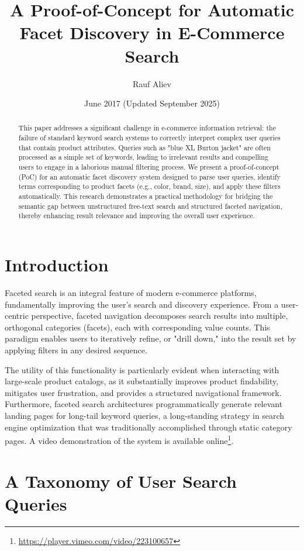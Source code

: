 \documentclass{article}
\title{\textbf{A Proof-of-Concept for Automatic Facet Discovery in E-Commerce Search}}
\author{Rauf Aliev}
\date{June 2017 (Updated September 2025)}
\begin{document}
    \maketitle

    \begin{abstract}
        This paper addresses a significant challenge in e-commerce information retrieval: the failure of standard keyword search systems to correctly interpret complex user queries that contain product attributes. Queries such as "blue XL Burton jacket" are often processed as a simple set of keywords, leading to irrelevant results and compelling users to engage in a laborious manual filtering process. We present a proof-of-concept (PoC) for an automatic facet discovery system designed to parse user queries, identify terms corresponding to product facets (e.g., color, brand, size), and apply these filters automatically. This research demonstrates a practical methodology for bridging the semantic gap between unstructured free-text search and structured faceted navigation, thereby enhancing result relevance and improving the overall user experience.
    \end{abstract}

    \section{Introduction}

    Faceted search is an integral feature of modern e-commerce platforms, fundamentally improving the user's search and discovery experience. From a user-centric perspective, faceted navigation decomposes search results into multiple, orthogonal categories (facets), each with corresponding value counts. This paradigm enables users to iteratively refine, or "drill down," into the result set by applying filters in any desired sequence.

    The utility of this functionality is particularly evident when interacting with large-scale product catalogs, as it substantially improves product findability, mitigates user frustration, and provides a structured navigational framework. Furthermore, faceted search architectures programmatically generate relevant landing pages for long-tail keyword queries, a long-standing strategy in search engine optimization that was traditionally accomplished through static category pages. A video demonstration of the system is available online\footnote{\url{https://player.vimeo.com/video/223100657}}.

    \section{A Taxonomy of User Search Queries}
\end{document}
